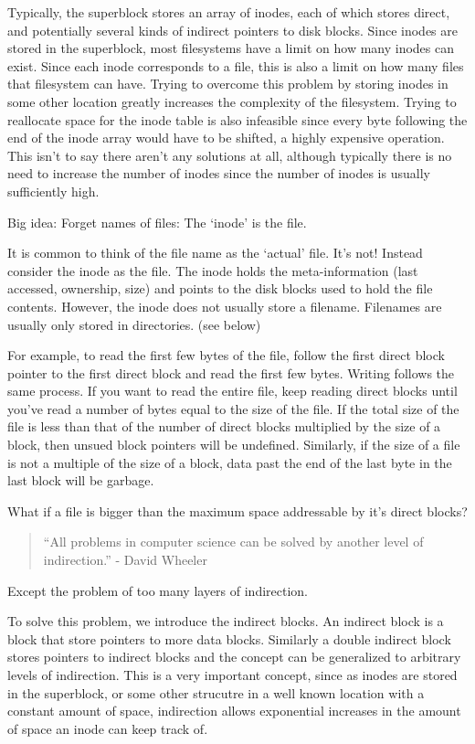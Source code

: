 Typically, the superblock stores an array of inodes, each of which stores direct, and potentially several kinds of indirect pointers to disk blocks. Since inodes are stored in the superblock, most filesystems have a limit on how many inodes can exist. Since each inode corresponds to a file, this is also a limit on how many files that filesystem can have. Trying to overcome this problem by storing inodes in some other location greatly increases the complexity of the filesystem. Trying to reallocate space for the inode table is also infeasible since every byte following the end of the inode array would have to be shifted, a highly expensive operation. This isn't to say there aren't any solutions at all, although typically there is no need to increase the number of inodes since the number of inodes is usually sufficiently high.

Big idea: Forget names of files: The `inode' is the file.

It is common to think of the file name as the `actual' file. It's not! Instead consider the inode as the file. The inode holds the meta-information (last accessed, ownership, size) and points to the disk blocks used to hold the file contents. However, the inode does not usually store a filename. Filenames are usually only stored in directories. (see below)

For example, to read the first few bytes of the file, follow the first direct block pointer to the first direct block and read the first few bytes. Writing follows the same process. If you want to read the entire file, keep reading direct blocks until you've read a number of bytes equal to the size of the file. If the total size of the file is less than that of the number of direct blocks multiplied by the size of a block, then unsued block pointers will be undefined. Similarly, if the size of a file is not a multiple of the size of a block, data past the end of the last byte in the last block will be garbage.

What if a file is bigger than the maximum space addressable by it's direct blocks?

\begin{quote}
``All problems in computer science can be solved by another level of indirection.'' - David Wheeler
\end{quote}

Except the problem of too many layers of indirection.

To solve this problem, we introduce the indirect blocks. An indirect block is a block that store pointers to more data blocks. Similarly a double indirect block stores pointers to indirect blocks and the concept can be generalized to arbitrary levels of indirection. This is a very important concept, since as inodes are stored in the superblock, or some other strucutre in a well known location with a constant amount of space, indirection allows exponential increases in the amount of space an inode can keep track of.

